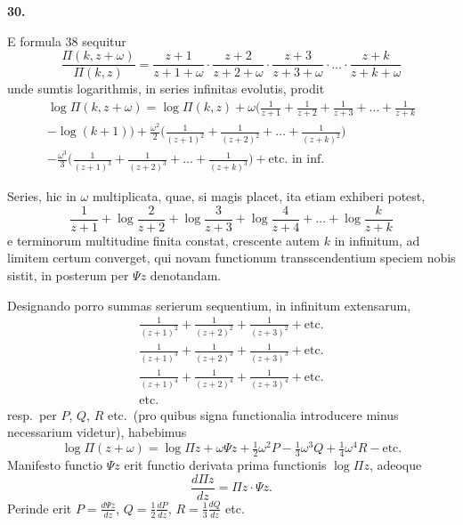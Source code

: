 \documentclass[12pt,a4paper]{article}
\newcommand{\art}[1]{\par\medskip\noindent\textbf{#1.}\par\nopagebreak\smallskip}
\begin{document}
\art{30}

E formula 38 sequitur
\[
\frac{\Pi(k,z+\omega)}{\Pi(k,z)} = \frac{z+1}{z+1+\omega}\cdot\frac{z+2}{z+2+\omega}\cdot\frac{z+3}{z+3+\omega}\cdot\ldots\cdot\frac{z+k}{z+k+\omega}
\]
unde sumtis logarithmis, in series infinitas evolutis, prodit
\begin{multline}
\log\Pi(k,z+\omega) = \log\Pi(k,z) + \omega\bigl(\frac{1}{z+1} + \frac{1}{z+2} + \frac{1}{z+3} + \ldots + \frac{1}{z+k}\\
- \log(k+1)\bigr) + \frac{\omega^2}{2}\bigl(\frac{1}{(z+1)^2} + \frac{1}{(z+2)^2} + \ldots + \frac{1}{(z+k)^2}\bigr)\\
- \frac{\omega^3}{3}\bigl(\frac{1}{(z+1)^3} + \frac{1}{(z+2)^3} + \ldots + \frac{1}{(z+k)^3}\bigr) + \text{etc.\ in inf.}\tag{[60]}
\end{multline}

Series, hic in $\omega$ multiplicata, quae, si magis placet, ita etiam exhiberi potest,
\[
\frac{1}{z+1} + \log\frac{2}{z+2} + \log\frac{3}{z+3} + \log\frac{4}{z+4} + \ldots + \log\frac{k}{z+k}
\]
e terminorum multitudine finita constat, crescente autem $k$ in infinitum, ad limitem certum converget, qui novam functionum transscendentium speciem nobis sistit, in posterum per $\Psi z$ denotandam.

Designando porro summas serierum sequentium, in infinitum extensarum,
\begin{align*}
\frac{1}{(z+1)^2} + \frac{1}{(z+2)^2} + \frac{1}{(z+3)^2} + \text{etc.}\\
\frac{1}{(z+1)^3} + \frac{1}{(z+2)^3} + \frac{1}{(z+3)^3} + \text{etc.}\\
\frac{1}{(z+1)^4} + \frac{1}{(z+2)^4} + \frac{1}{(z+3)^4} + \text{etc.}\\
\text{etc.}
\end{align*}
resp.\ per $P$, $Q$, $R$ etc.\ (pro quibus signa functionalia introducere minus necessarium videtur), habebimus
\begin{equation}
\log\Pi(z+\omega) = \log\Pi z + \omega\Psi z + \tfrac{1}{2}\omega^2 P - \tfrac{1}{3}\omega^3 Q + \tfrac{1}{4}\omega^4 R - \text{etc.}\tag{[61]}
\end{equation}
Manifesto functio $\Psi z$ erit functio derivata prima functionis $\log\Pi z$, adeoque
\begin{equation}
\frac{d\Pi z}{dz} = \Pi z\cdot\Psi z.\tag{[62]}
\end{equation}
Perinde erit $P=\frac{d\Psi z}{dz}$, $Q=\frac{1}{2}\frac{dP}{dz}$, $R=\frac{1}{3}\frac{dQ}{dz}$ etc.
\end{document}
